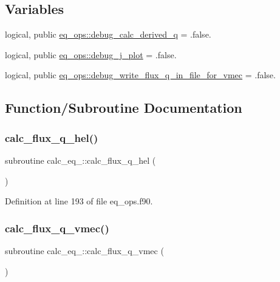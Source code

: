 \subsection*{Variables}
\begin{DoxyCompactItemize}
\item 
logical, public \hyperlink{namespaceeq__ops_a1b6609a8d8b427d9133bf323e732f209}{eq\+\_\+ops\+::debug\+\_\+calc\+\_\+derived\+\_\+q} = .false.
\item 
logical, public \hyperlink{namespaceeq__ops_a45ba7f46fd439bbd73edfd1fd548b58e}{eq\+\_\+ops\+::debug\+\_\+j\+\_\+plot} = .false.
\item 
logical, public \hyperlink{namespaceeq__ops_adf0e2b602c58383d648a2543a17189c9}{eq\+\_\+ops\+::debug\+\_\+write\+\_\+flux\+\_\+q\+\_\+in\+\_\+file\+\_\+for\+\_\+vmec} = .false.
\end{DoxyCompactItemize}


\subsection{Function/\+Subroutine Documentation}
\mbox{\label{eq__ops_8f90_a6513c2a78e561f6349e4524f6933e283}} 
\subsubsection{\texorpdfstring{calc\+\_\+flux\+\_\+q\+\_\+hel()}{calc\_flux\_q\_hel()}}
{\footnotesize\ttfamily subroutine calc\+\_\+eq\+\_\+::calc\+\_\+flux\+\_\+q\+\_\+hel (\begin{DoxyParamCaption}{ }\end{DoxyParamCaption})}



Definition at line 193 of file eq\+\_\+ops.\+f90.

\mbox{\label{eq__ops_8f90_a886bd144f9e11efb18f34b5d1f06e5c5}} 
\subsubsection{\texorpdfstring{calc\+\_\+flux\+\_\+q\+\_\+vmec()}{calc\_flux\_q\_vmec()}}
{\footnotesize\ttfamily subroutine calc\+\_\+eq\+\_\+::calc\+\_\+flux\+\_\+q\+\_\+vmec (\begin{DoxyParamCaption}{ }\end{DoxyParamCaption})}



